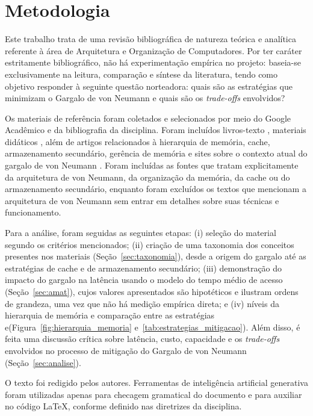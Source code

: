 \documentclass[12pt]{article}
\begin{document}
\section{Metodologia} \label{sec:metodologia}

Este trabalho trata de uma revisão bibliográfica de natureza teórica e analítica referente à área de Arquitetura e Organização de Computadores. Por ter caráter estritamente bibliográfico, não há experimentação empírica no projeto: baseia-se exclusivamente na leitura, comparação e síntese da literatura, tendo como objetivo responder à seguinte questão norteadora: quais são as estratégias que minimizam o Gargalo de von Neumann e quais são os \textit{trade-offs} envolvidos? 

Os materiais de referência foram coletados e selecionados por meio do Google Acadêmico e da bibliografia da disciplina. Foram incluídos livros-texto \cite{stallings2010, tanenbaum2013, hennessy2017}, materiais didáticos \cite{miletto2014, oliveira2019, couto2017}, além de artigos relacionados à hierarquia de memória, cache, armazenamento secundário, gerência de memória e sites sobre o contexto atual do gargalo de von Neumann \cite{maues2025, ferreira2015, santos2015, souza2023, hess2025}. Foram incluídas as fontes que tratam explicitamente da arquitetura de von Neumann, da organização da memória, da cache ou do armazenamento secundário, enquanto foram excluídos os textos que mencionam a arquitetura de von Neumann sem entrar em detalhes sobre suas técnicas e funcionamento.

Para a análise, foram seguidas as seguintes etapas: (i) seleção do material segundo os critérios mencionados; (ii) criação de uma taxonomia dos conceitos presentes nos materiais (Seção~\ref{sec:taxonomia}), desde a origem do gargalo até as estratégias de cache e de armazenamento secundário; (iii) demonstração do impacto do gargalo na latência usando o modelo do tempo médio de acesso (Seção~\ref{sec:amat}), cujos valores apresentados são hipotéticos e ilustram ordens de grandeza, uma vez que não há medição empírica direta; e (iv) níveis da hierarquia de memória e comparação entre as estratégias e(Figura~\ref{fig:hierarquia_memoria} e~\ref{tab:estrategias_mitigacao}). Além disso, é feita uma discussão crítica sobre latência, custo, capacidade e os \textit{trade-offs} envolvidos no processo de mitigação do Gargalo de von Neumann (Seção~\ref{sec:analise}). 

O texto foi redigido pelos autores. Ferramentas de inteligência artificial generativa foram utilizadas apenas para checagem gramatical do documento e para auxiliar no código \LaTeX, conforme definido nas diretrizes da disciplina.
\end{document}
